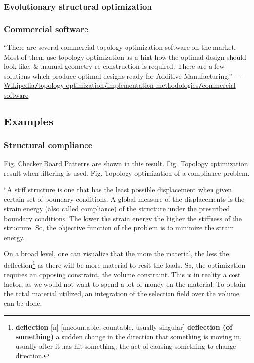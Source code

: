 \documentclass[oneside]{book}
\numberwithin{equation}{section}
\begin{document}
\subsubsection{Evolutionary structural optimization}

\subsubsection{Commercial software}
``There are several commercial topology optimization software on the market. Most of them use topology optimization as a hint how the optimal design should look like, \& manual geometry re-construction is required. There are a few solutions which produce optimal designs ready for Additive Manufacturing.'' -- -- \href{https://en.wikipedia.org/wiki/Topology_optimization#Commercial_software}{Wikipedia\texttt{/}topology optimization\texttt{/}implementation methodologies\texttt{/}commercial software}

\subsection{Examples}

\subsubsection{Structural compliance}
\textsf{Fig. Checker Board Patterns are shown in this result.} \textsf{Fig. Topology optimization result when filtering is used.} \textsf{Fig. Topology optimization of a compliance problem.}

``A stiff structure is one that has the least possible displacement when given certain set of boundary conditions. A global measure of the displacements is the \href{https://en.wikipedia.org/wiki/Strain_energy}{strain energy} (also called \href{https://en.wikipedia.org/wiki/Stiffness#Compliance}{compliance}) of the structure under the prescribed boundary conditions. The lower the strain energy the higher the stiffness of the structure. So, the objective function of the problem is to minimize the strain energy.

On a broad level, one can visualize that the more the material, the less the deflection\footnote{\textbf{deflection} [n] [uncountable, countable, usually singular] \textbf{deflection (of something)} a sudden change in the direction that something is moving in, usually after it has hit something; the act of causing something to change direction.} as there will be more material to resit the loads. So, the optimization requires an opposing constraint, the volume constraint. This is in reality a cost factor, as we would not want to spend a lot of money on the material. To obtain the total material utilized, an integration of the selection field over the volume can be done.
\end{document}
